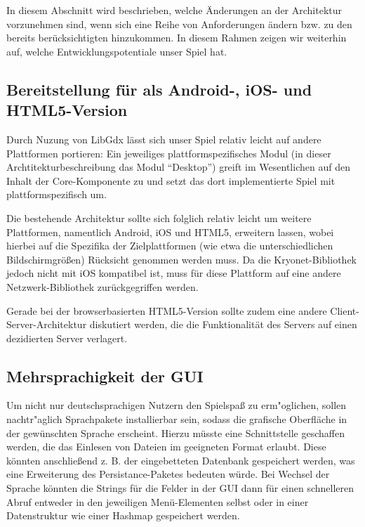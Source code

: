 \documentclass[enabledeprecatedfontcommands,fontsize=12pt,paper=a4,twoside,parskip=half]{scrartcl}
\begin{document}


In diesem Abschnitt wird beschrieben, welche Änderungen an der Architektur vorzunehmen sind, wenn sich eine Reihe von Anforderungen ändern bzw. zu den bereits berücksichtigten hinzukommen. In diesem Rahmen zeigen wir weiterhin auf, welche Entwicklungspotentiale unser Spiel hat.

\subsection{Bereitstellung für als Android-, iOS- und HTML5-Version}

Durch Nuzung von LibGdx lässt sich unser Spiel relativ leicht auf andere Plattformen portieren: Ein jeweiliges plattformspezifisches Modul (in dieser Archtitekturbeschreibung das Modul \enquote{Desktop}) greift im Wesentlichen auf den Inhalt der Core-Komponente zu und setzt das dort implementierte Spiel mit plattformspezifisch um.

Die bestehende Architektur sollte sich folglich relativ leicht um weitere Plattformen, namentlich Android, iOS und HTML5, erweitern lassen, wobei hierbei auf die Spezifika der Zielplattformen (wie etwa die unterschiedlichen Bildschirmgrößen) Rücksicht genommen werden muss. Da die Kryonet-Bibliothek jedoch nicht mit iOS kompatibel ist, muss für diese Plattform auf eine andere Netzwerk-Bibliothek zurückgegriffen werden. 

Gerade bei der browserbasierten HTML5-Version sollte zudem eine andere Client-Server-Architektur diskutiert werden, die die Funktionalität des Servers auf einen dezidierten Server verlagert. 

\subsection{Mehrsprachigkeit der GUI}
Um nicht nur deutschsprachigen Nutzern den Spielspa{\ss} zu erm"oglichen, sollen nachtr"aglich Sprachpakete installierbar sein, sodass die grafische Oberfläche in der gewünschten Sprache erscheint. 
Hierzu müsste eine Schnittstelle geschaffen werden, die das Einlesen von Dateien im geeigneten Format erlaubt. Diese könnten anschließend z. B. der eingebetteten Datenbank gespeichert werden, was eine Erweiterung des Persistance-Paketes bedeuten würde. Bei Wechsel der Sprache könnten die Strings für die Felder in der GUI dann für einen schnelleren Abruf entweder in den jeweiligen Menü-Elementen selbst oder in einer Datenstruktur wie einer  Hashmap gespeichert werden.
\end{document}
